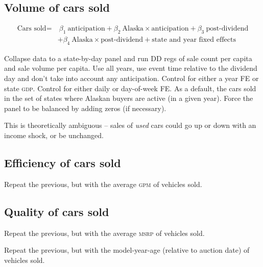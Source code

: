 \documentclass[11pt,letterpaper,oneside]{article}
\newcommand{\gpm}{\textsc{gpm}}
\newcommand{\msrp}{\textsc{msrp}}
\newcommand{\gdp}{\textsc{gdp}}
\begin{document}
\subsection{Volume of cars sold}
\begin{align}
    \label{eqn:cars_sold_with_anticipation}
    \text{Cars sold} = & \ \beta_1 \ \text{anticipation} + \beta_2 \ \text{Alaska} \times \text{anticipation} + \beta_3 \ \text{post-dividend} \\ \nonumber
    &+ \beta_4 \ \text{Alaska} \times \text{post-dividend} + \text{state and year fixed effects}
\end{align}

Collapse data to a state-by-day panel and run DD regs of sale count per capita and sale volume per capita.
Use all years, use event time relative to the dividend day and don't take into account any anticipation.
Control for either a year FE or state \gdp{}. Control for either daily or day-of-week FE.
As a default, the cars sold in the set of states where Alaskan buyers are active (in a given year).
Force the panel to be balanced by adding zeros (if necessary).

This is theoretically ambiguous -- sales of \emph{used} cars could go up or down with an income shock, or be unchanged.





\subsection{Efficiency of cars sold}
Repeat the previous, but with the average \gpm{} of vehicles sold.

\subsection{Quality of cars sold}
Repeat the previous, but with the average \msrp{} of vehicles sold.

Repeat the previous, but with the model-year-age (relative to auction date) of vehicles sold.
\end{document}
